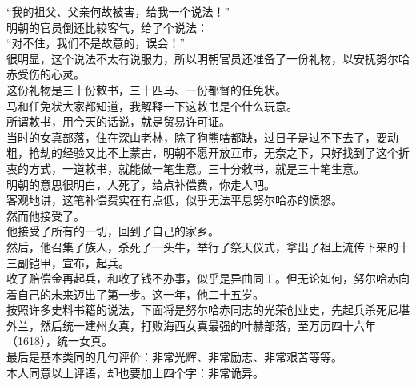 \begin{multicols}{\theparacolNo}
“我的祖父、父亲何故被害，给我一个说法！”\\

明朝的官员倒还比较客气，给了个说法：\\

“对不住，我们不是故意的，误会！”\\

很明显，这个说法不太有说服力，所以明朝官员还准备了一份礼物，以安抚努尔哈赤受伤的心灵。\\

这份礼物是三十份敕书，三十匹马、一份都督的任免状。\\

马和任免状大家都知道，我解释一下这敕书是个什么玩意。\\

所谓敕书，用今天的话说，就是贸易许可证。\\

当时的女真部落，住在深山老林，除了狗熊啥都缺，过日子是过不下去了，要动粗，抢劫的经验又比不上蒙古，明朝不愿开放互市，无奈之下，只好找到了这个折衷的方式，一道敕书，就能做一笔生意。三十分敕书，就是三十笔生意。\\

明朝的意思很明白，人死了，给点补偿费，你走人吧。\\

客观地讲，这笔补偿费实在有点低，似乎无法平息努尔哈赤的愤怒。\\

然而他接受了。\\

他接受了所有的一切，回到了自己的家乡。\\

然后，他召集了族人，杀死了一头牛，举行了祭天仪式，拿出了祖上流传下来的十三副铠甲，宣布，起兵。\\

收了赔偿金再起兵，和收了钱不办事，似乎是异曲同工。但无论如何，努尔哈赤向着自己的未来迈出了第一步。这一年，他二十五岁。\\

按照许多史料书籍的说法，下面将是努尔哈赤同志的光荣创业史，先起兵杀死尼堪外兰，然后统一建州女真，打败海西女真最强的叶赫部落，至万历四十六年（1618），统一女真。\\

最后是基本类同的几句评价：非常光辉、非常励志、非常艰苦等等。\\

本人同意以上评语，却也要加上四个字：非常诡异。\\


\end{multicols}
